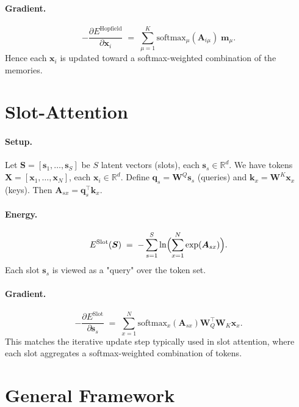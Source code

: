 \documentclass{article}
\begin{document}
\paragraph{Gradient.}
\[
-\frac{\partial E^{\mathrm{Hopfield}}}{\partial \bm{x}_i}
\;=\;
\sum_{\mu=1}^K
\text{softmax}_\mu(\bm{A}_{i\mu})
\;\bm{m}_\mu.
\]
Hence each \(\bm{x}_i\) is updated toward a softmax-weighted combination of the memories.

\section{Slot-Attention}

\paragraph{Setup.}
Let \(\bm{S} = [\bm{s}_1,\ldots,\bm{s}_S]\) be \(S\) latent vectors (slots), each \(\bm{s}_s \in \mathbb{R}^d\).  
We have tokens \(\bm{X} = [\bm{x}_1,\ldots,\bm{x}_N]\), each \(\bm{x}_i \in \mathbb{R}^d\).  
Define 
\(\bm{q}_s = \bm{W}^Q \bm{s}_s\) (queries) and \(\bm{k}_x = \bm{W}^K \bm{x}_x\) (keys).  
Then
\(\bm{A}_{sx} = \bm{q}_s^\top \bm{k}_x.\)

\paragraph{Energy.}
\begin{equation}
E^{\mathrm{Slot}}(\bm{S})
\;=\;
-\sum_{s=1}^S
\ln \Bigl(\sum_{x=1}^N \exp(\bm{A}_{sx})\Bigr).
\label{eq:slot-energy}
\end{equation}
Each slot \(\bm{s}_s\) is viewed as a "query" over the token set.

\paragraph{Gradient.}
\begin{equation}
-\frac{\partial E^{\mathrm{Slot}}}{\partial \bm{s}_s}
\;=\;
\sum_{x=1}^N \text{softmax}_x(\bm{A}_{sx}) \bm{W}_Q^\top 
\bm{W}_K \bm{x}_x.
\end{equation}
This matches the iterative update step typically used in slot attention, where each slot aggregates a softmax-weighted combination of tokens.

\section{General Framework}
\end{document}
